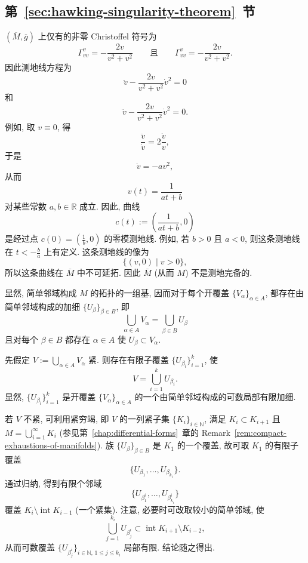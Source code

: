 \subsection{\texorpdfstring{第~\ref{sec:hawking-singularity-theorem}~节}{Hawking 奇性定理}}\label{subsec:solutions-hawking-singularity-theorem}

\begin{description}[font=\normalfont,leftmargin=2em,labelwidth=1.5em]
$(\overline M,\overline g)$ 上仅有的非零 Christoffel 符号为
\[
  \Gamma_{vv}^v=-\frac{2v}{v^2+\mathit{v}^2}
  \qquad\text{且}\qquad
  \Gamma_{\mathit{v}\mathit{v}}^{\mathit{v}}
    =-\frac{2\mathit{v}}{v^2+\mathit{v}^2}.
\]
因此测地线方程为
\[
  \ddot v-\frac{2v}{v^2+\mathit{v}^2}\dot v^2=0
\]
和
\[
  \ddot{\mathit{v}}-\frac{2\mathit{v}}{v^2+\mathit{v}^2}\dot{\mathit{v}}^2=0.
\]
例如, 取 $\mathit{v}\equiv0$, 得
\[
  \frac{\ddot v}{\dot v}=2\frac{\dot v}{v},
\]
于是
\[
  \dot v=-av^2,
\]
从而
\[
  v(t)=\frac{1}{at+b}
\]
对某些常数 $a,b\in\mathbb{R}$ 成立. 因此, 曲线
\[
  c(t):=\left(\frac{1}{at+b},0\right)
\]
是经过点 $c(0)=(\frac{1}{b},0)$ 的零模测地线. 例如, 若 $b>0$ 且 $a<0$, 则这条测地线在 $t<-\frac{b}{a}$ 上有定义. 这条测地线的像为
\[
  \{(v,0)\mid v>0\},
\]
所以这条曲线在 $\overline M$ 中不可延拓. 因此 $\overline M$ (从而 $M$) 不是测地完备的.

显然, 简单邻域构成 $M$ 的拓扑的一组基, 因而对于每个开覆盖 $\{V_\alpha\}_{\alpha\in A}$, 都存在由简单邻域构成的加细 $\{U_\beta\}_{\beta\in B}$, 即
\[
  \bigcup_{\alpha\in A}V_\alpha=\bigcup_{\beta\in B}U_\beta
\]
且对每个 $\beta\in B$ 都存在 $\alpha\in A$ 使 $U_\beta\subset V_\alpha$.

先假定 $V:=\bigcup_{\alpha\in A}V_\alpha$ 紧. 则存在有限子覆盖 $\{U_{\beta_i}\}_{i=1}^k$, 使
\[
  V=\bigcup_{i=1}^k U_{\beta_i}.
\]
显然, $\{U_{\beta_i}\}_{i=1}^k$ 是开覆盖 $\{V_\alpha\}_{\alpha\in A}$ 的一个由简单邻域构成的可数局部有限加细.

若 $V$ 不紧, 可利用紧穷竭, 即 $V$ 的一列紧子集 $\{K_i\}_{i\in\mathbb{N}}$, 满足 $K_i\subset K_{i+1}$ 且 $M=\bigcup_{i=1}^\infty K_i$ (参见第~\ref{chap:differential-forms}~章的 Remark~\ref{rem:compact-exhaustions-of-manifolds}). 族 $\{U_\beta\}_{\beta\in B}$ 是 $K_1$ 的一个覆盖, 故可取 $K_1$ 的有限子覆盖
\[
  \{U_{\beta_1},\ldots,U_{\beta_{k_1}}\}.
\]
通过归纳, 得到有限个邻域
\[
  \{U_{\beta_1^i},\ldots,U_{\beta_{k_i}^i}\}
\]
覆盖 $K_i\setminus\operatorname{int}K_{i-1}$ (一个紧集). 注意, 必要时可改取较小的简单邻域, 使
\[
  \bigcup_{j=1}^{k_i}U_{\beta_j^i}\subset\operatorname{int}K_{i+1}\setminus K_{i-2},
\]
从而可数覆盖 $\{U_{\beta_j^i}\}_{i\in\mathbb{N},\,1\leq j\leq k_i}$ 局部有限. 结论随之得出.


\end{description}

